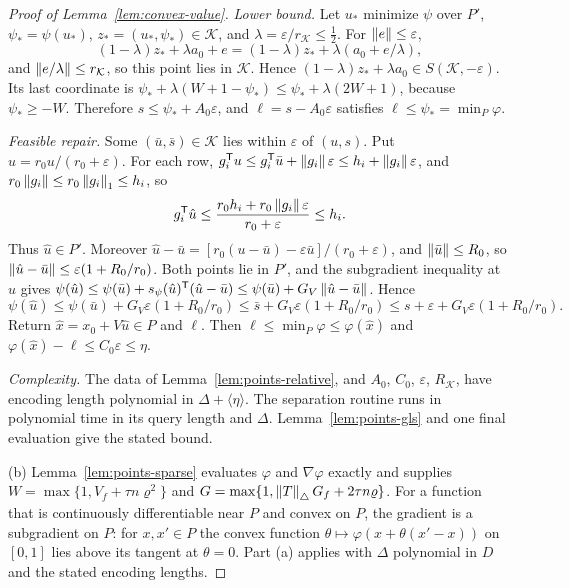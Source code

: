 \begin{proof}[Proof of Lemma~\ref{lem:convex-value}]
\emph{Lower bound.} Let $u_*$ minimize $\psi$ over $P'$, $\psi_*=\psi(u_*)$,
$z_*=(u_*,\psi_*)\in\mathcal K$, and $\lambda=\varepsilon/r_{\mathcal K}\le
\tfrac12$. For $\left\lVert e\right\rVert\le\varepsilon$,
\[
 (1-\lambda)z_*+\lambda a_0+e=(1-\lambda)z_*+\lambda(a_0+e/\lambda),
\]
and $\left\lVert e/\lambda\right\rVert\le r_{\mathcal K}$, so this point lies in
$\mathcal K$. Hence $(1-\lambda)z_*+\lambda a_0\in S(\mathcal
K,-\varepsilon)$. Its last coordinate is
$\psi_*+\lambda(W+1-\psi_*)\le\psi_*+\lambda(2W+1)$, because
$\psi_*\ge-W$. Therefore $s\le\psi_*+A_0\varepsilon$, and
$\ell=s-A_0\varepsilon$ satisfies $\ell\le\psi_*=\min_P\varphi$.

\emph{Feasible repair.} Some $(\bar u,\bar s)\in\mathcal K$ lies within
$\varepsilon$ of $(u,s)$. Put $\hat u=r_0u/(r_0+\varepsilon)$. For each row,
$g_i^{\mathsf T}u\le g_i^{\mathsf T}\bar u+\left\lVert g_i\right\rVert\varepsilon\le
h_i+\left\lVert g_i\right\rVert\varepsilon$, and $r_0\left\lVert g_i\right\rVert\le r_0\left\lVert g_i\right\rVert_1\le h_i$, so
\[
 g_i^{\mathsf T}\hat u\le\frac{r_0h_i+r_0\left\lVert g_i\right\rVert\varepsilon}
 {r_0+\varepsilon}\le h_i .
\]
Thus $\hat u\in P'$. Moreover
$\hat u-\bar u=[r_0(u-\bar u)-\varepsilon\bar u]/(r_0+\varepsilon)$, and
$\left\lVert\bar u\right\rVert\le R_0$, so
$\left\lVert\hat u-\bar u\right\rVert\le\varepsilon(1+R_0/r_0)$. Both points lie in $P'$,
and the subgradient inequality at $\hat u$ gives
$\psi(\hat u)\le\psi(\bar u)+s_\psi(\hat u)^{\mathsf T}(\hat u-\bar u)\le
\psi(\bar u)+G_V\left\lVert\hat u-\bar u\right\rVert$. Hence
\[
 \psi(\hat u)\le\psi(\bar u)+G_V\varepsilon(1+R_0/r_0)
 \le\bar s+G_V\varepsilon(1+R_0/r_0)
 \le s+\varepsilon+G_V\varepsilon(1+R_0/r_0).
\]
Return $\hat x=x_0+V\hat u\in P$ and $\ell$. Then
$\ell\le\min_P\varphi\le\varphi(\hat x)$ and
$\varphi(\hat x)-\ell\le C_0\varepsilon\le\eta$.

\emph{Complexity.} The data of Lemma~\ref{lem:points-relative}, and $A_0$,
$C_0$, $\varepsilon$, $R_{\mathcal K}$, have encoding length polynomial in
$\Delta+\langle\eta\rangle$. The separation routine runs in polynomial time
in its query length and $\Delta$. Lemma~\ref{lem:points-gls} and one final
evaluation give the stated bound.

(b) Lemma~\ref{lem:points-sparse} evaluates $\varphi$ and $\nabla\varphi$
exactly and supplies $W=\max\{1,V_f+\tau n\varrho^2\}$ and
$G=\max\{1,\left\lVert T\right\rVert_\triangle G_f+2\tau n\varrho\}$. For a function that is
continuously differentiable near $P$ and convex on $P$, the gradient is a
subgradient on $P$: for $x,x'\in P$ the convex function
$\theta\mapsto\varphi(x+\theta(x'-x))$ on $[0,1]$ lies above its tangent at
$\theta=0$. Part (a) applies with $\Delta$ polynomial in $D$ and the stated
encoding lengths.
\end{proof}

